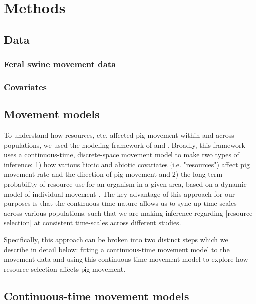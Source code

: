 \documentclass[a4paper]{article}
\begin{document}
\section*{Methods}

\subsection*{Data}

\subsubsection*{Feral swine movement data}

\subsubsection*{Covariates}

\subsection*{Movement models}

To understand how resources, etc. affected pig movement within and across populations, we used the modeling framework of \cite{Hanks2015} and \cite{Wilson2018}. Broadly, this framework uses a continuous-time, discrete-space movement model to make two types of inference: 1) how various biotic and abiotic covariates (i.e. "resources") affect pig movement rate and the direction of pig movement \citep{Hanks2015} and 2) the long-term probability of resource use for an organism in a given area, based on a dynamic model of individual movement \citep{Wilson2018}.  The key advantage of this approach for our purposes is that the continuous-time nature allows us to sync-up time scales across various populations, such that we are making inference regarding [resource selection] at consistent time-scales across different studies. 

Specifically, this approach can be broken into two distinct steps which we describe in detail below: fitting a continuous-time movement model to the movement data and using this continuous-time movement model to explore how resource selection affects pig movement.

\subsection*{Continuous-time movement models}

\end{document}
